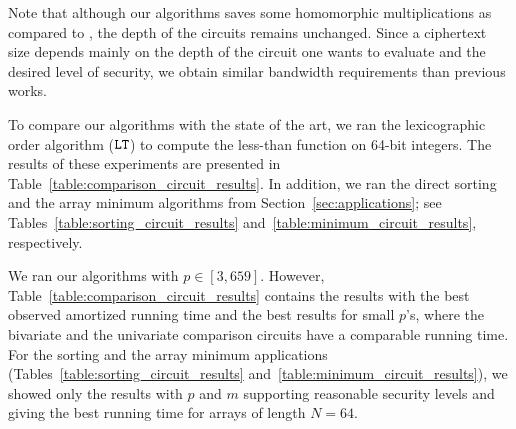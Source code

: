 Note that although our algorithms saves some homomorphic multiplications as compared to \cite{TLWRK20}, the depth of the circuits remains unchanged. Since a ciphertext size depends mainly on the depth of the circuit one wants to evaluate and the desired level of security, we obtain similar bandwidth requirements than previous works.

To compare our algorithms with the state of the art, we ran the lexicographic order algorithm ($\mathtt{LT}$) to compute the less-than function on 64-bit integers.
The results of these experiments are presented in Table~\ref{table:comparison_circuit_results}.
In addition, we ran the direct sorting and the array minimum algorithms from Section~\ref{sec:applications}; see Tables~\ref{table:sorting_circuit_results} and~\ref{table:minimum_circuit_results}, respectively.

We ran our algorithms with $p \in [3,659]$.
However, Table~\ref{table:comparison_circuit_results} contains the results with the best observed amortized running time and the best results for small $p$'s, where the bivariate and the univariate comparison circuits have a comparable running time.
For the sorting and the array minimum applications (Tables~\ref{table:sorting_circuit_results} and~\ref{table:minimum_circuit_results}), we showed only the results with $p$ and $m$ supporting reasonable security levels and giving the best running time for arrays of length $N=64$.


